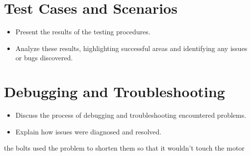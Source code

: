 \section{Test Cases and Scenarios}
\begin{itemize}
	\item Present the results of the testing procedures.
	\item Analyze these results, highlighting successful areas and identifying any issues or bugs discovered.
\end{itemize}
\section{Debugging and Troubleshooting}
\begin{itemize}
	\item Discuss the process of debugging and troubleshooting encountered problems.
	\item Explain how issues were diagnosed and resolved.
\end{itemize}

\begin{notebox}
	the bolts used the problem to shorten them so that it wouldn't touch the motor 
\end{notebox}


